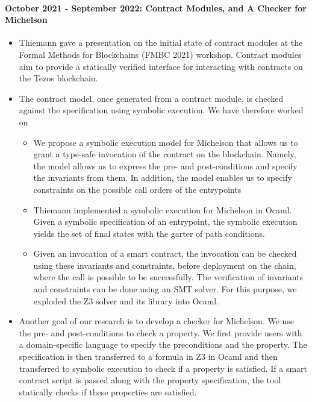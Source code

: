 \documentclass[a4paper,11pt]{article}
\begin{document}
\paragraph{October 2021 - September 2022: Contract Modules, and A Checker for Michelson}
\begin{itemize}
\item Thiemann gave a presentation on the initial state of contract modules at the Formal Methods for Blockchains (FMBC 2021) workshop. Contract modules aim to provide a statically verified interface for interacting with contracts on the Tezos blockchain.
\item The contract model, once generated from a contract module, is checked against the specification using symbolic execution. We have therefore worked on

\begin{itemize}
\item We propose a symbolic execution model for Michelson that allows us to grant a type-safe invocation of the contract on the blockchain. Namely, the model allows us to express the pre- and post-conditions and specify the invariants from them. In addition, the model enables us to specify constraints on the possible call orders of the entrypoints

\item Thiemann implemented a symbolic execution for Michelson in Ocaml. Given a symbolic specification of an entrypoint, the symbolic execution yields the set of final states with the garter of path conditions. 
\item Given an invocation of a smart contract, the invocation can be checked  using these invariants and constraints, before deployment on the chain, where the call is possible to be successfully. The verification of invariants and constraints can be done using an SMT solver. For this purpose, we exploded the Z3 solver and its library into Ocaml.
\end{itemize}

\item Another goal of our research is to develop a checker for Michelson. We use the pre- and post-conditions to check a property. We first provide users with a domain-specific language to specify the preconditions and the property. The specification is then transferred to a formula in Z3 in Ocaml and then transferred to symbolic execution to check if a property is satisfied. If a smart contract script is passed along with the property specification, the tool statically checks if these properties are satisfied.
\end{itemize}
\end{document}

